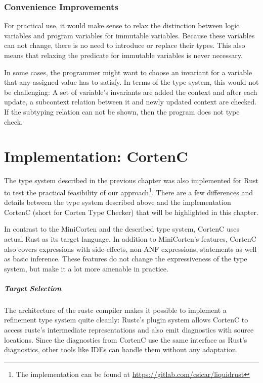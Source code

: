 \documentclass[twoside, english]{sdqthesis}
\theoremstyle{definition}
\begin{document}
\subsection{Convenience Improvements}

For practical use, it would make sense to relax the distinction between logic variables and program variables for immutable variables. Because these variables can not change, there is no need to introduce or replace their types. This also means that relaxing the predicate for immutable variables is never necessary.

In some cases, the programmer might want to choose an invariant for a variable that any assigned value has to satisfy. In terms of the type system, this would not be challenging: A set of variable's invariants are added the context and after each update, a subcontext relation between it and newly updated context are checked. If the subtyping relation can not be shown, then the program does not type check.

\chapter{Implementation: CortenC} \label{ch:implementation}

The type system described in the previous chapter was also implemented for Rust to test the practical feasibility of our approach\footnote{The implementation can be found at \url{https://gitlab.com/csicar/liquidrust}}.
There are a few differences and details between the type system described above and the implementation CortenC (short for Corten Type Checker) that will be highlighted in this chapter.

In contrast to the MiniCorten and the described type system, CortenC uses actual Rust as its target language. In addition to MiniCorten's features, CortenC also covers expressions with side-effects, non-ANF expressions, statements as well as basic inference.
These features do not change the expressiveness of the type system, but make it a lot more amenable in practice.

\paragraph{Target Selection}
The architecture of the rustc compiler makes it possible to implement a refinement type system quite cleanly: Rustc's plugin system allows CortenC to access rustc's intermediate representations and also emit diagnostics with source locations. Since the diagnostics from CortenC use the same interface as Rust's diagnostics, other tools like IDEs can handle them without any adaptation.
\end{document}
